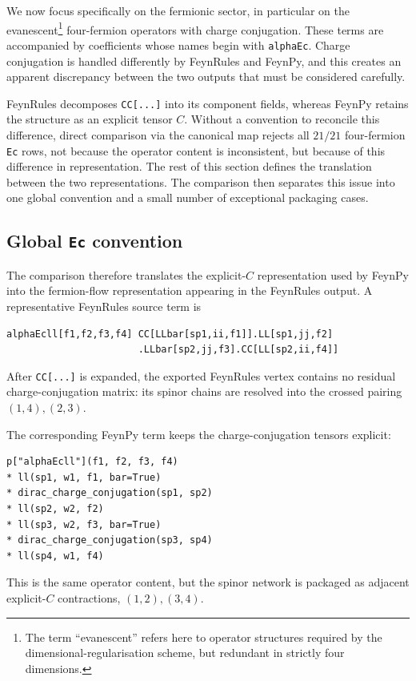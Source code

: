 We now focus specifically on the fermionic sector, in particular on the evanescent\footnote{The term ``evanescent'' refers here to operator structures required by the dimensional-regularisation scheme, but redundant in strictly four dimensions.} four-fermion operators with charge conjugation. These terms are accompanied by coefficients whose names begin with \texttt{alphaEc}. Charge conjugation is handled differently by FeynRules and FeynPy, and this creates an apparent discrepancy between the two outputs that must be considered carefully.

FeynRules decomposes \texttt{CC[...]} into its component fields, whereas FeynPy retains the structure as an explicit tensor $C$. Without a convention to reconcile this difference, direct comparison via the canonical map rejects all $21/21$ four-fermion \texttt{Ec} rows, not because the operator content is inconsistent, but because of this difference in representation. The rest of this section defines the translation between the two representations. The comparison then separates this issue into one global convention and a small number of exceptional packaging cases.

\subsection{Global \texttt{Ec} convention}
\label{sec:validation-ec-overdetermination}

The comparison therefore translates the explicit-$C$ representation used by FeynPy into the fermion-flow representation appearing in the FeynRules output. A representative FeynRules source term is
\begin{verbatim}
alphaEcll[f1,f2,f3,f4] CC[LLbar[sp1,ii,f1]].LL[sp1,jj,f2]
                       .LLbar[sp2,jj,f3].CC[LL[sp2,ii,f4]]
\end{verbatim}
After \texttt{CC[...]} is expanded, the exported FeynRules vertex contains no residual charge-conjugation matrix: its spinor chains are resolved into the crossed pairing $(1,4),(2,3)$.

The corresponding FeynPy term keeps the charge-conjugation tensors explicit:
\begin{verbatim}
p["alphaEcll"](f1, f2, f3, f4)
* ll(sp1, w1, f1, bar=True)
* dirac_charge_conjugation(sp1, sp2)
* ll(sp2, w2, f2)
* ll(sp3, w2, f3, bar=True)
* dirac_charge_conjugation(sp3, sp4)
* ll(sp4, w1, f4)
\end{verbatim}
This is the same operator content, but the spinor network is packaged as adjacent explicit-$C$ contractions, $(1,2),(3,4)$.

